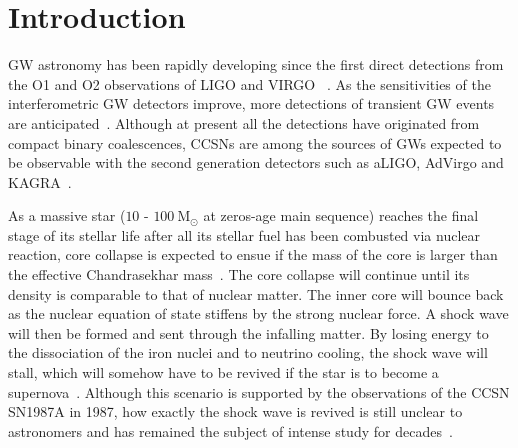 \documentclass[aps,twocolumn,showpacs,groupedaddress, nofootinbib]{revtex4}  %
\begin{document}
\section{Introduction}
\ac{GW} astronomy has been rapidly developing since the first direct detections from the O1 and O2 observations of LIGO and VIRGO~
\cite{abbott2016observation, abbott2016gw151226, abbott2017gw170608, abbott2017gw170814, abbott2017gw170817, abbott2017gravitational, abbott2017multi, abbott2019gwtc}.
As the sensitivities of the interferometric \ac{GW} detectors improve, 
more detections of transient \ac{GW} events are anticipated~\cite{abbott2018prospects}.
Although at present all the detections have originated from compact binary coalescences,
\acp{CCSN} are among the sources of \acp{GW} expected to be observable with the second generation detectors 
such as \ac{aLIGO}, \ac{AdVirgo} and KAGRA~\cite{aasi2015advanced, acernese2014advanced, aso2013interferometer, gossan2016observing, abbott2016first}.

As a massive star ($10$ - $100~\text{M}_\odot$ at zeros-age main sequence) reaches the final stage of 
its stellar life after all its stellar fuel has been combusted via nuclear reaction, 
core collapse is expected to ensue if the mass of the core is larger than the effective Chandrasekhar mass~\cite{baron1990effect, bethe1990supernova}.
The core collapse will continue until its density is comparable to that of nuclear matter.
The inner core will bounce back as the nuclear equation of state stiffens by the strong nuclear force.
A shock wave will then be formed and sent through the infalling matter.
By losing energy to the dissociation of the iron nuclei and to neutrino cooling, the shock wave will stall, which
will somehow have to be revived if the star is to become a supernova~\cite{o2011black}.
Although this scenario is supported by the observations of the \ac{CCSN} SN1987A \cite{sato1987analysis} in 1987, 
how exactly the shock wave is revived is still unclear to astronomers and has remained the subject of intense study for decades~\cite{janka2012explosion}.
\end{document}
